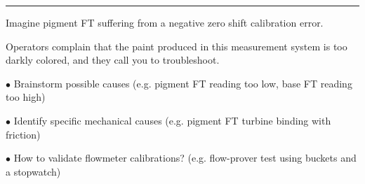 \filbreak \vskip 5pt \hrule \vskip 5pt  \vskip 10pt

Imagine pigment FT suffering from a negative zero shift calibration error.

\vskip 10pt

Operators complain that the paint produced in this measurement system is too darkly colored, and they call you to troubleshoot.

\medskip
\item{$\bullet$} Brainstorm possible causes (e.g. pigment FT reading too low, base FT reading too high)
\item{$\bullet$} Identify specific mechanical causes (e.g. pigment FT turbine binding with friction)
\item{$\bullet$} How to validate flowmeter calibrations? (e.g. flow-prover test using buckets and a stopwatch)
\medskip



\bye



